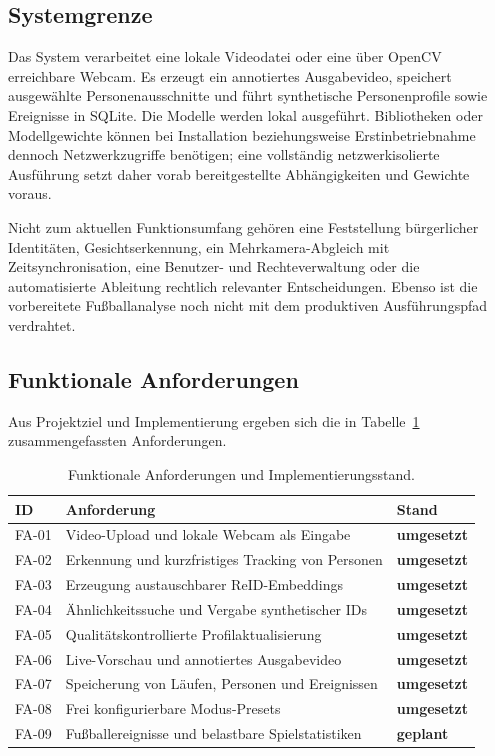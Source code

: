 \documentclass[runningheads]{llncs}
\newcommand{\yes}{\textbf{umgesetzt}}
\newcommand{\planned}{\textbf{geplant}}
\begin{document}
\subsection{Systemgrenze}

Das System verarbeitet eine lokale Videodatei oder eine über OpenCV erreichbare Webcam. Es erzeugt ein annotiertes Ausgabevideo, speichert ausgewählte Personenausschnitte und führt synthetische Personenprofile sowie Ereignisse in SQLite. Die Modelle werden lokal ausgeführt. Bibliotheken oder Modellgewichte können bei Installation beziehungsweise Erstinbetriebnahme dennoch Netzwerkzugriffe benötigen; eine vollständig netzwerkisolierte Ausführung setzt daher vorab bereitgestellte Abhängigkeiten und Gewichte voraus.

Nicht zum aktuellen Funktionsumfang gehören eine Feststellung bürgerlicher Identitäten, Gesichtserkennung, ein Mehrkamera-Abgleich mit Zeitsynchronisation, eine Benutzer- und Rechteverwaltung oder die automatisierte Ableitung rechtlich relevanter Entscheidungen. Ebenso ist die vorbereitete Fußballanalyse noch nicht mit dem produktiven Ausführungspfad verdrahtet.

\subsection{Funktionale Anforderungen}

Aus Projektziel und Implementierung ergeben sich die in Tabelle~\ref{tab:functional-requirements} zusammengefassten Anforderungen.

\begin{table}[t]
\caption{Funktionale Anforderungen und Implementierungsstand.}
\label{tab:functional-requirements}
\centering
\small
\begin{tabularx}{\columnwidth}{@{}p{}X p{}@{}}
\toprule
ID & Anforderung & Stand \\
\midrule
FA-01 & Video-Upload und lokale Webcam als Eingabe & \yes \\
FA-02 & Erkennung und kurzfristiges Tracking von Personen & \yes \\
FA-03 & Erzeugung austauschbarer ReID-Embeddings & \yes \\
FA-04 & Ähnlichkeitssuche und Vergabe synthetischer IDs & \yes \\
FA-05 & Qualitätskontrollierte Profilaktualisierung & \yes \\
FA-06 & Live-Vorschau und annotiertes Ausgabevideo & \yes \\
FA-07 & Speicherung von Läufen, Personen und Ereignissen & \yes \\
FA-08 & Frei konfigurierbare Modus-Presets & \yes \\
FA-09 & Fußballereignisse und belastbare Spielstatistiken & \planned \\
\bottomrule
\end{tabularx}
\end{table}
\end{document}
